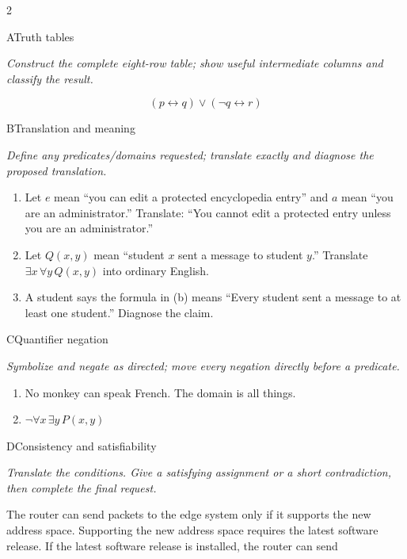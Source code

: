 \documentclass[9pt]{extarticle}
\begin{document}
\CoreWorkArea
\FormBreak
{}
\begin{multicols}{2}
\begin{CoreProblem}{A}{Truth tables}
{\scriptsize\textit{Construct the complete eight-row table; show useful intermediate columns and classify the result.}\par}
\[
  (p\leftrightarrow q)\lor(\neg q\leftrightarrow r)
\]
\end{CoreProblem}
\begin{CoreProblem}{B}{Translation and meaning}
{\scriptsize\textit{Define any predicates/domains requested; translate exactly and diagnose the proposed translation.}\par}
\begin{enumerate}[label=(\alph*)]
  \item Let $e$ mean ``you can edit a protected encyclopedia entry'' and $a$
        mean ``you are an administrator.'' Translate: ``You cannot edit a
        protected entry unless you are an administrator.''
  \item Let $Q(x,y)$ mean ``student $x$ sent a message to student $y$.''
        Translate $\exists x\,\forall y\,Q(x,y)$ into ordinary English.
  \item A student says the formula in (b) means ``Every student sent a message
        to at least one student.'' Diagnose the claim.
\end{enumerate}
\end{CoreProblem}
\begin{CoreProblem}{C}{Quantifier negation}
{\scriptsize\textit{Symbolize and negate as directed; move every negation directly before a predicate.}\par}
\begin{enumerate}[label=(\alph*)]
  \item No monkey can speak French. The domain is all things.
  \item $\neg\forall x\,\exists y\,P(x,y)$
\end{enumerate}
\end{CoreProblem}
\columnbreak
\begin{CoreProblem}{D}{Consistency and satisfiability}
{\scriptsize\textit{Translate the conditions. Give a satisfying assignment or a short contradiction, then complete the final request.}\par}
The router can send packets to the edge system only if it supports the new
address space. Supporting the new address space requires the latest software
release. If the latest software release is installed, the router can send

\end{CoreProblem}
\end{multicols}
\end{document}
